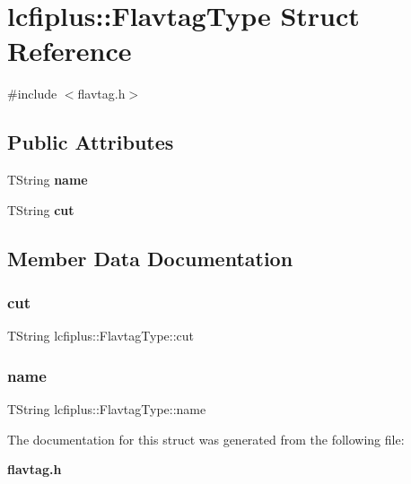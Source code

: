 \section{lcfiplus\+:\+:Flavtag\+Type Struct Reference}
\label{structlcfiplus_1_1FlavtagType}


{\ttfamily \#include $<$flavtag.\+h$>$}

\subsection*{Public Attributes}
\begin{DoxyCompactItemize}
\item 
T\+String \textbf{ name}
\item 
T\+String \textbf{ cut}
\end{DoxyCompactItemize}


\subsection{Member Data Documentation}
\mbox{\label{structlcfiplus_1_1FlavtagType_a5f9e0f11aacc3b9ef1fdce68fe2ffda3}} 
\subsubsection{cut}
{\footnotesize\ttfamily T\+String lcfiplus\+::\+Flavtag\+Type\+::cut}

\mbox{\label{structlcfiplus_1_1FlavtagType_a41acddbb497954e875416c16648c0b08}} 
\subsubsection{name}
{\footnotesize\ttfamily T\+String lcfiplus\+::\+Flavtag\+Type\+::name}



The documentation for this struct was generated from the following file\+:\begin{DoxyCompactItemize}
\item 
\textbf{ flavtag.\+h}\end{DoxyCompactItemize}
